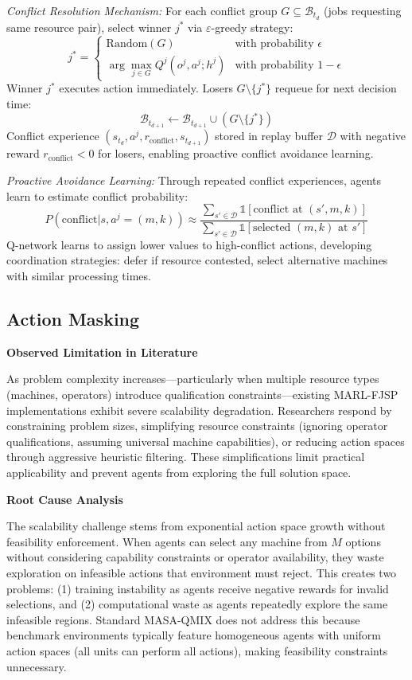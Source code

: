 \textit{Conflict Resolution Mechanism:} For each conflict group \( G \subseteq \mathcal{B}_{t_d} \) (jobs requesting same resource pair), select winner \( j^* \) via \( \varepsilon \)-greedy strategy:
\[
j^* = \begin{cases}
\text{Random}(G) & \text{with probability } \epsilon \\
\arg\max_{j \in G} Q^j(o^j, a^j; h^j) & \text{with probability } 1 - \epsilon
\end{cases}
\]
Winner \( j^* \) executes action immediately. Losers \( G \setminus \{j^*\} \) requeue for next decision time:
\[
\mathcal{B}_{t_{d+1}} \leftarrow \mathcal{B}_{t_{d+1}} \cup (G \setminus \{j^*\})
\]
Conflict experience \( (s_{t_d}, a^j, r_{\text{conflict}}, s_{t_{d+1}}) \) stored in replay buffer \( \mathcal{D} \) with negative reward \( r_{\text{conflict}} < 0 \) for losers, enabling proactive conflict avoidance learning.

\textit{Proactive Avoidance Learning:} Through repeated conflict experiences, agents learn to estimate conflict probability:
\[
P(\text{conflict} | s, a^j = (m, k)) \approx \frac{\sum_{s' \in \mathcal{D}} \mathbb{1}[\text{conflict at } (s', m, k)]}{\sum_{s' \in \mathcal{D}} \mathbb{1}[\text{selected } (m, k) \text{ at } s']}
\]
Q-network learns to assign lower values to high-conflict actions, developing coordination strategies: defer if resource contested, select alternative machines with similar processing times.


\subsection{Action Masking}
\label{sec:action_masking}

\textbf{Observed Limitation in Literature}

As problem complexity increases—particularly when multiple resource types (machines, operators) introduce qualification constraints—existing MARL-FJSP implementations exhibit severe scalability degradation. Researchers respond by constraining problem sizes, simplifying resource constraints (ignoring operator qualifications, assuming universal machine capabilities), or reducing action spaces through aggressive heuristic filtering. These simplifications limit practical applicability and prevent agents from exploring the full solution space.

\textbf{Root Cause Analysis}

The scalability challenge stems from exponential action space growth without feasibility enforcement. When agents can select any machine from \( M \) options without considering capability constraints or operator availability, they waste exploration on infeasible actions that environment must reject. This creates two problems: (1) training instability as agents receive negative rewards for invalid selections, and (2) computational waste as agents repeatedly explore the same infeasible regions. Standard MASA-QMIX does not address this because benchmark environments typically feature homogeneous agents with uniform action spaces (all units can perform all actions), making feasibility constraints unnecessary.


